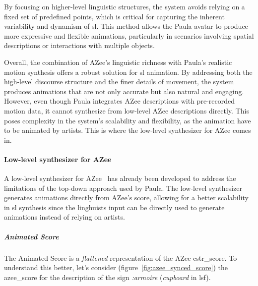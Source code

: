 \documentclass[../../main.tex]{subfiles}
\begin{document}
By focusing on higher-level linguistic structures, the system avoids relying on a fixed set of predefined points, which is critical for capturing the inherent variability and dynamism of \gls{sl}. This method allows the Paula avatar to produce more expressive and flexible animations, particularly in scenarios involving spatial descriptions or interactions with multiple objects.

Overall, the combination of AZee’s linguistic richness with Paula’s realistic motion synthesis offers a robust solution for \gls{sl} animation. By addressing both the high-level discourse structure and the finer details of movement, the system produces animations that are not only accurate but also natural and engaging. However, even though Paula integrates AZee descriptions with pre-recorded motion data, it cannot synthesize from low-level AZee descriptions directly. This poses complexity in the system's scalability and flexibility, as the animation have to be animated by artists. This is where the low-level synthesizer for AZee comes in.

\paragraph{Low-level synthesizer for AZee}
\label{ch:background_work:sign_language_synthesis:3d_techniques:sign_language_synthesis_systems:azee_based:low_level_synthesizer_for_azee}

A low-level synthesizer for AZee~\cite{nunnari2018animating} has already been developed to address the limitations of the top-down approach used by Paula. The low-level synthesizer generates animations directly from AZee's \gls{score}, allowing for a better scalability in \gls{sl} synthesis since the linghuists input can be directly used to generate animations instead of relying on artists.

\subparagraph{Animated Score}
\label{ch:background_work:sign_language_synthesis:3d_techniques:sign_language_synthesis_systems:azee_based:low_level_synthesizer_for_azee:animated_score}

The Animated Score is a \emph{flattened} representation of the AZee \gls{cstr_score}. To understand this better, let's consider (figure~\ref{fig:azee_synced_score}) the \gls{azee_score} for the description of the sign \emph{:armoire} (\emph{cupboard} in \gls{lsf}).
\end{document}
